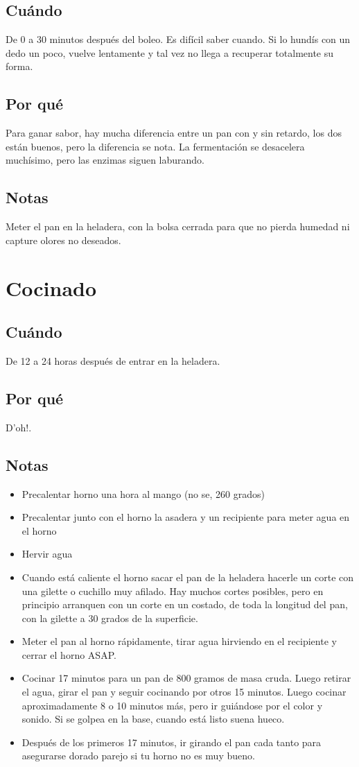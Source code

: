 \documentclass[10pt,a4paper]{article}
\begin{document}
\subsection*{Cuándo}
De 0 a 30 minutos después del boleo. Es difícil saber cuando. Si lo hundís con
un dedo un poco, vuelve lentamente y tal vez no llega a recuperar totalmente su forma.
\subsection*{Por qué}
Para ganar sabor, hay mucha diferencia entre un pan con y sin
retardo, los dos están buenos, pero la diferencia se nota. La fermentación se
desacelera muchísimo, pero las enzimas siguen laburando.

\subsection*{Notas}
Meter el pan en la heladera, con la bolsa cerrada para que no pierda humedad ni
capture olores no deseados.

\section{Cocinado}
\subsection*{Cuándo}
De 12 a 24 horas después de entrar en la heladera.
\subsection*{Por qué}
D'oh!.
\subsection*{Notas}
\begin{itemize}
\item Precalentar horno una hora al mango (no se, 260 grados)
\item Precalentar junto con el horno la asadera y un recipiente para meter
  agua en el horno
\item Hervir agua
\item Cuando está caliente el horno sacar el pan de la heladera hacerle un
  corte con una gilette o cuchillo muy afilado. Hay muchos cortes posibles,
  pero en principio arranquen con un corte en un costado, de toda la
  longitud del pan, con la gilette a 30 grados de la superficie.

\item Meter el pan al horno rápidamente, tirar agua hirviendo en el
  recipiente y cerrar el horno ASAP.
\item Cocinar 17 minutos para un pan de 800 gramos de masa cruda. Luego
  retirar el agua, girar el pan y seguir cocinando por otros 15 minutos.
  Luego cocinar aproximadamente 8 o 10 minutos más, pero ir guiándose por el
  color y sonido. Si se golpea en la base, cuando está listo suena hueco.
\item Después de los primeros 17 minutos, ir girando el pan cada tanto para
  asegurarse dorado parejo si tu horno no es muy bueno.
\end{itemize}
\end{document}

